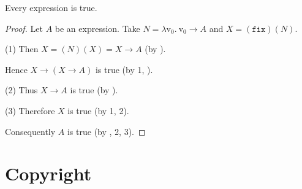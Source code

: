 \documentclass{article}
\newcommand{\var}[1]{\textrm{v}_{#1}}
\newcommand{\abs}[2]{\lambda\var{#1}.\ #2}
\newcommand{\app}[2]{(#1)(#2)}
\newcommand{\fix}{\texttt{fix}}
\begin{document}
  \begin{forthel}
    \begin{theorem*}\label{curry_paradox}
      Every expression is true.
    \end{theorem*}
    \begin{proof}
      Let $A$ be an expression.
      Take $N = \abs{0}{\var{0} \rightarrow A}$ and $X = \app{\fix}{N}.$
  
      (1) Then $X = \app{N}{X} = X \rightarrow A$ (by ).
  
      Hence $X \rightarrow (X \rightarrow A)$ is true (by 1, ).
  
      (2) Thus $X \rightarrow A$ is true (by ).
  
      (3) Therefore $X$ is true (by 1, 2).
  
      Consequently $A$ is true (by , 2, 3).
    \end{proof}
  \end{forthel}

  \printbibliography

  \section*{Copyright}
  \doclicenseThis
\end{document}
